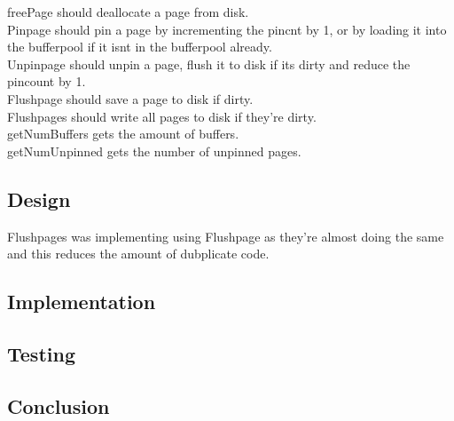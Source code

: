 \documentclass[a4paper,10pt,titlepage]{report}
\begin{document}
freePage should deallocate a page from disk.\\

Pinpage should pin a page by incrementing the pincnt by 1, or by loading it into the bufferpool if it isnt in the bufferpool already.\\

Unpinpage should unpin a page, flush it to disk if its dirty and reduce the pincount by 1.\\

Flushpage should save a page to disk if dirty.\\

Flushpages should write all pages to disk if they're dirty.\\

getNumBuffers gets the amount of buffers.\\

getNumUnpinned gets the number of unpinned pages.

\subsection{Design}

Flushpages was implementing using Flushpage as they're almost doing the same and this reduces the amount of dubplicate code. 

\subsection{Implementation}

\subsection{Testing}

\subsection{Conclusion}
\end{document}
